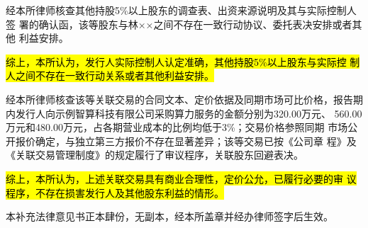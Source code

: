 \documentclass[zihao=-4]{ctexart}
\begin{document}
经本所律师核查其他持股5\%以上股东的调查表、出资来源说明及其与实际控制人签
署的确认函，该等股东与林××之间不存在一致行动协议、委托表决安排或者其他
利益安排。

\hl{综上，本所认为，发行人实际控制人认定准确，其他持股5\%以上股东与实际控
制人之间不存在一致行动关系或者其他利益安排。}


\opReply

经本所律师核查该等关联交易的合同文本、定价依据及同期市场可比价格，报告期
内发行人向示例智算科技有限公司采购算力服务的金额分别为320.00万元、
560.00万元和480.00万元，占各期营业成本的比例均低于3\%；交易价格参照同期
市场公开报价确定，与独立第三方报价不存在显著差异；该等交易已按《公司章
程》及《关联交易管理制度》的规定履行了审议程序，关联股东回避表决。

\hl{综上，本所认为，上述关联交易具有商业合理性，定价公允，已履行必要的审
议程序，不存在损害发行人及其他股东利益的情形。}

\vspace{0.5\baselineskip}
本补充法律意见书正本肆份，无副本，经本所盖章并经办律师签字后生效。

\end{document}
